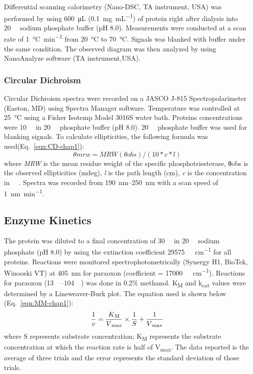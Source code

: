 \begin{refsection}
Differential scanning calorimetry (Nano-DSC, TA instrument, USA) was performed
by using \SI{600}{\micro\L} (\SI{0.1}{\mg\per\mL}) of protein right after
dialysis into \SI{20}{\milli\Molar} sodium phosphate buffer (pH 8.0).
Measurements were conducted at a scan rate of \SI{1}{\celsius\per\minute} from
\SI{20}{\celsius} to \SI{70}{\celsius}.  Signals was blanked with buffer under
the same condition.  The observed diagram was then analyzed by using
NanoAnalyze software (TA instrument,USA).

\subsubsection{Circular Dichroism}
\label{sec:cd-method}

Circular Dichroism spectra were recorded on a JASCO J-815 Spectropolarimeter
(Easton, MD) using Spectra Manager software. Temperature was controlled at
\SI{25}{\celsius} using a Fisher Isotemp Model 3016S water bath. Proteins
concentrations were \SI{10}{\micro\Molar} in \SI{20}{\milli\Molar} phosphate
buffer (pH 8.0).  \SI{20}{\milli\Molar} phosphate buffer was used for blanking
signals. To calculate ellipticities, the following formula was
used(Eq.~\ref{eqn:CD-chap1}): 
\begin{equation}
    θmrw = MRW(θobs) / (10 * c * l) 
    \label{eqn:CD-chap1}
\end{equation}
where \emph{MRW} is the mean residue weight of the specific phosphotriesterase,
θobs is the observed ellipticities (mdeg), \emph{l} is the path length (cm),
\emph{c} is the concentration in \SI{}{\micro\Molar}. Spectra was recorded from
\SIrange{190}{250}{\nm} with a scan speed of \SI{1}{\nano\meter\per\minute}.

\subsection{Enzyme Kinetics}
\label{sec:kinetics-method}

The protein was diluted to a final concentration of \SI{30}{\nano\Molar} in
\SI{20}{\milli\Molar} sodium phosphate (pH 8.0) by using the extinction
coefficient \SI{29575}{\per\Molar\per\cm} for all proteins\cite{Gasteiger2005,
Pace1995}.  Reactions were monitored spectrophotometrically (Synergy H1,
BioTek, Winooski VT) at \SI{405}{\nm} for paraoxon (coefficient =
\SI{17000}{\per\Molar\per\cm})\cite{Baker2011b}. Reactions for paraoxon
(\SIrange{13}{104}{\micro\Molar}) was done in 0.2\% methanol.
K\textsubscript{M} and k\textsubscript{cat} values were determined by a
Lineweaver-Burk plot.\cite{Baker2011b} The equation used is shown below
(Eq.~\ref{eqn:MM-chap1}): 
\begin{equation} 
    \frac{1}{v} =
    \frac{K\textsubscript{M}}{V\textsubscript{max}}\times\frac{1}{S} +
    \frac{1}{V\textsubscript{max}} 
    \label{eqn:MM-chap1}
\end{equation}
where S represents substrate concentration; K\textsubscript{M} represents the
substrate concentration at which the reaction rate is half of
V\textsubscript{max}. The data reported is the average of three trials and the
error represents the standard deviation of those trials.


\end{refsection}
